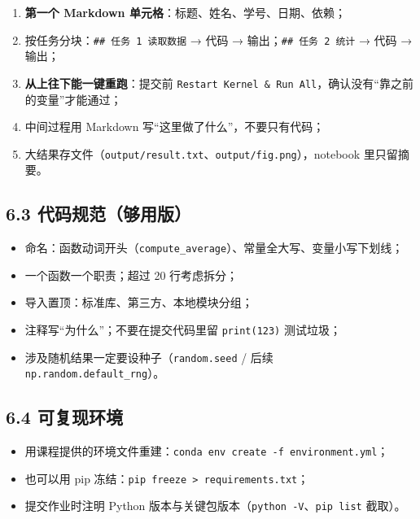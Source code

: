 \begin{enumerate}
\def\labelenumi{\arabic{enumi}.}
\tightlist
\item
  \textbf{第一个 Markdown 单元格}：标题、姓名、学号、日期、依赖；
\item
  按任务分块：\texttt{\#\#\ 任务\ 1\ 读取数据} → 代码 →
  输出；\texttt{\#\#\ 任务\ 2\ 统计} → 代码 → 输出；
\item
  \textbf{从上往下能一键重跑}：提交前
  \texttt{Restart\ Kernel\ \&\ Run\ All}，确认没有``靠之前的变量''才能通过；
\item
  中间过程用 Markdown 写``这里做了什么''，不要只有代码；
\item
  大结果存文件（\texttt{output/result.txt}、\texttt{output/fig.png}），notebook
  里只留摘要。
\end{enumerate}

\subsection{6.3
代码规范（够用版）}\label{ux4ee3ux7801ux89c4ux8303ux591fux7528ux7248}

\begin{itemize}
\tightlist
\item
  命名：函数动词开头（\texttt{compute\_average}）、常量全大写、变量小写下划线；
\item
  一个函数一个职责；超过 20 行考虑拆分；
\item
  导入置顶：标准库、第三方、本地模块分组；
\item
  注释写``为什么''；不要在提交代码里留 \texttt{print(123)} 测试垃圾；
\item
  涉及随机结果一定要设种子（\texttt{random.seed} / 后续
  \texttt{np.random.default\_rng}）。
\end{itemize}

\subsection{6.4 可复现环境}\label{ux53efux590dux73b0ux73afux5883}

\begin{itemize}
\tightlist
\item
  用课程提供的环境文件重建：\texttt{conda\ env\ create\ -f\ environment.yml}；
\item
  也可以用 pip
  冻结：\texttt{pip\ freeze\ \textgreater{}\ requirements.txt}；
\item
  提交作业时注明 Python
  版本与关键包版本（\texttt{python\ -V}、\texttt{pip\ list} 截取）。
\end{itemize}

